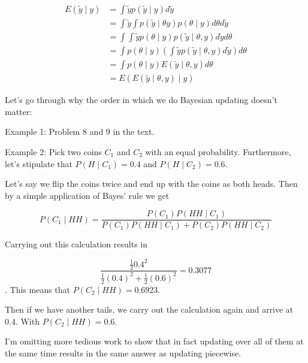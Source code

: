 \documentclass[a4paper]{article}
\begin{document}
\begin{align}
	E\left( \tilde{y} \mid y \right) &= \int \tilde{y} p\left( \tilde{y} \mid y \right) d \tilde{y} \\
	&= \int \tilde{y} \int p\left( \tilde{y} \mid \theta y \right) p\left( \theta \mid y \right) d\theta d\tilde{y} \\
	&= \int \int \tilde{y} p\left( \theta \mid y \right) p\left( \tilde{y} \mid \theta , y \right) d\tilde{y} d\theta\\
	&= \int p\left( \theta \mid y \right) \left( \int \tilde{y} p\left( \tilde {y} \mid \theta, y \right) d\tilde{y} \right)d\theta\\
	&= \int p\left( \theta \mid y \right) E\left( \tilde{y} \mid \theta, y \right) d\theta \\
	&= E\left( E\left( \tilde{y} \mid \theta, y \right) \mid y \right)
\end{align}

Let's go through why the order in which we do Bayesian updating doesn't matter:

Example 1: Problem 8 and 9 in the text.

Example 2: Pick two coins $C_1$ and $C_2$ with an equal probability.
Furthermore, let's stipulate that $P\left( H \mid C_1 \right) = 0.4$ and
$P\left( H \mid C_2 \right) = 0.6$.

Let's say we flip the coins twice and end up with the coins as both heads. Then by a simple application of Bayes' rule we get

\begin{equation}
	P\left( C_1 \mid HH \right) = \frac{P\left( C_1 \right) P\left( HH \mid C_1 \right)}{P\left( C_1 \right) P\left( HH \mid C_1 \right) + P\left( C_2 \right) P\left( HH \mid C_2 \right)}
\end{equation}

Carrying out this calculation results in

\begin{equation}
	\frac{\frac{1}{2} 0.4 ^2}{\frac{1}{2} \left( 0.4 \right) ^2 + \frac{1}{2} \left( 0.6 \right) ^2} = 0.3077
\end{equation}.
This means that $P\left( C_2 \mid HH \right) = 0.6923$.

Then if we have another tails, we carry out the calculation again and arrive at 0.4. With $P\left( C_2 \mid HH \right) = 0.6$.

I'm omitting more tedious work to show that in fact updating over all of them
at the same time results in the same answer as updating piecewise.
\end{document}
